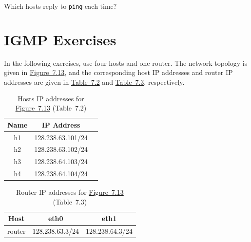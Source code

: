 \documentclass{../UTNetLab}
\begin{document}
    \begin{report}
    \item Which hosts reply to \lstinline{ping} each time?
    \end{report}

\part{IGMP Exercises}\label{sec:igmp}
    In the following exercises, use four hosts and one router.
    The network topology is given in \hyperref[fig:7.13]{Figure~7.13}, and the corresponding host IP addresses and router IP addresses are given in \hyperref[tab:7.2]{Table~7.2} and \hyperref[tab:7.3]{Table~7.3}, respectively.

    \begin{table}[H]
        \caption{Hosts IP addresses for \hyperref[fig:7.13]{Figure~7.13} (Table~7.2)}
        \label{tab:7.2}
        \centering
        \begin{tabular}{ *3c }
            \hline \hline
            Name & IP Address \\
            \hline
                h1 & 128.238.63.101/24 \\
                h2 & 128.238.63.102/24 \\
                h3 & 128.238.64.103/24 \\
                h4 & 128.238.64.104/24 \\
            \hline \hline
            \end{tabular}
    \end{table}

    \begin{table}[H]
        \caption{Router IP addresses for \hyperref[fig:7.13]{Figure~7.13} (Table~7.3)}
        \label{tab:7.3}
        \centering
        \begin{tabular}{ *3c }
            \hline \hline
            Host & eth0 & eth1 \\
            \hline
            router & 128.238.63.3/24 & 128.238.64.3/24 \\
            \hline \hline
            \end{tabular}
    \end{table}
\end{document}
